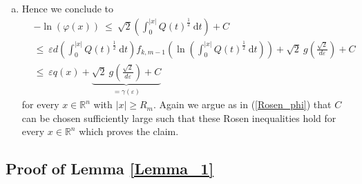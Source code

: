 \documentclass[12pt,longbibliography]{article}
\def\R{\mathbb{R}}
\theoremstyle{definition}
\theoremstyle{remark}
\theoremstyle{example}
\begin{document}
\begin{enumerate}[a)]
\item Hence we conclude to
\begin{align*}
& -\ln \left( \varphi(x) \right) \ \leq \ \sqrt{2} \left( \int_{0}^{|x|} Q(t)^{\frac{1}{2}} \ \mathrm{d}t \right) + C \\
& \leq \ \varepsilon d \left( \int_{0}^{|x|} Q(t)^{\frac{1}{2}} \ \mathrm{d}t \right)
f_{k,m-1} \left( \ln\left( \int_{0}^{|x|} Q(t)^{\frac{1}{2}} \ \mathrm{d}t \right) \right)
 + \sqrt{2} \ g\left( \frac{\sqrt{2}}{d \varepsilon} \right) + C \\
& \leq \ \varepsilon q(x) + \underbrace{\sqrt{2} \ g\left( \frac{\sqrt{2}}{d \varepsilon} \right) + C}_{=\gamma(\varepsilon)} 
\end{align*}
for every $x \in \R^{n}$ with $|x| \geq R_{m}$. Again we argue as in (\ref{Rosen_phi}) that $C$ can be chosen sufficiently large such
that these Rosen inequalities hold for every $x \in \R^{n}$ which proves the claim.
\end{enumerate}

\subsection{Proof of Lemma \ref{Lemma_1}}
\end{document}
